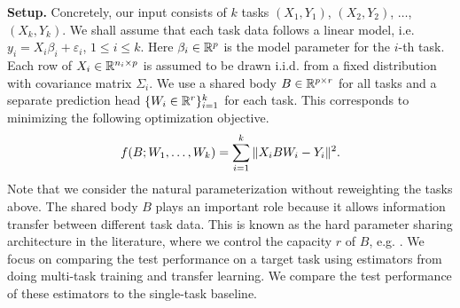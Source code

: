 

\textbf{Setup.} Concretely, our input consists of $k$ tasks $(X_1, Y_1)$, $(X_2, Y_2)$, $\dots$, $(X_k, Y_k)$.
We shall assume that each task data follows a linear model, i.e. $y_i = X_i \beta_i + \varepsilon_i$, $1\le i\le k$.
Here $\beta_i\in\mathbb{R}^p$ is the model parameter for the $i$-th task.
Each row of $X_i\in\mathbb{R}^{n_i\times p}$ is assumed to be drawn i.i.d. from a fixed distribution with covariance matrix $\Sigma_i$.
We use a shared body $B\in\mathbb{R}^{p\times r}$ for all tasks and a separate prediction head $\{W_i \in \mathbb{R}^{r}\}_{i=1}^k$ for each task.
This corresponds to minimizing the following optimization objective.
\begin{align}
	\label{eq_mtl}
	f(B; W_1, \dots, W_k) = \sum_{i=1}^k \|X_i B W_i - Y_i\|^2.
\end{align}
Note that we consider the natural parameterization without reweighting the tasks above.
The shared body $B$ plays an important role because it allows information transfer between different task data.
This is known as the hard parameter sharing architecture in the literature, where we control the capacity $r$ of $B$, e.g. \cite{KD12,WZR20}.
We focus on comparing the test performance on a target task using estimators from doing multi-task training and transfer learning.
We compare the test performance of these estimators to the single-task baseline.

